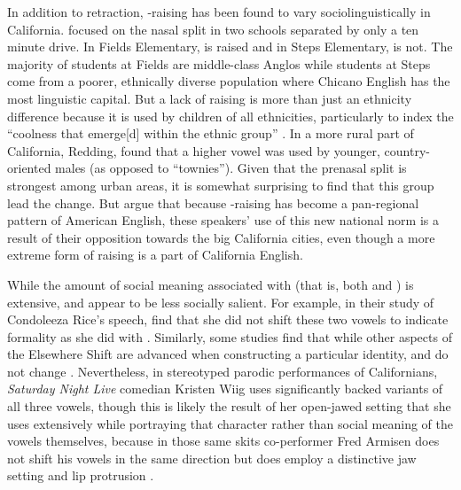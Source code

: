 In addition to \bat retraction, \ban-raising has been found to vary sociolinguistically in California. \citet{eckert_2008} focused on the nasal split in two schools separated by only a ten minute drive. In Fields Elementary, \ban is raised and in Steps Elementary, \ban is not. The majority of students at Fields are middle-class Anglos while students at Steps come from a poorer, ethnically diverse population where Chicano English has the most linguistic capital. But a lack of raising is more than just an ethnicity difference because it is used by children of all ethnicities, particularly to index the ``coolness that emerge[d] within the ethnic group'' \citeyearpar[41]{eckert_2008}. In a more rural part of California, Redding, \citet{podesva_etal_2015} found that a higher \ban vowel was used by younger, country-oriented males (as opposed to ``townies''). Given that the prenasal split is strongest among urban areas, it is somewhat surprising to find that this group lead the change. But \citeauthor{podesva_etal_2012} argue that because \ban-raising has become a pan-regional pattern of American English, these speakers' use of this new national norm is a result of their opposition towards the big California cities, even though a more extreme form of \ban raising is a part of California English.


While the amount of social meaning associated with \trap (that is, both \bat and \ban) is extensive, \dress and \kit appear to be less socially salient. For example, in their study of Condoleeza Rice's speech, \citet[76]{podesva_etal_2012} find that she did not shift these two vowels to indicate formality as she did with \trap. Similarly, some studies find that while other aspects of the Elsewhere Shift are advanced when constructing a particular identity, \bet and \bit do not change \citep{fought_2003, podesva_2011}. Nevertheless, in stereotyped parodic performances of Californians, \textit{Saturday Night Live} comedian Kristen Wiig uses significantly backed variants of all three vowels, though this is likely the result of her open-jawed setting that she uses extensively while portraying that character rather than social meaning of the vowels themselves, because in those same skits co-performer Fred Armisen does not shift his vowels in the same direction but does employ a distinctive jaw setting and lip protrusion \citep{pratt_donofrio_2017}.




